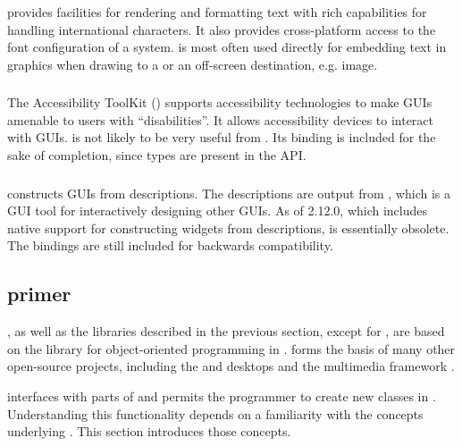 \documentclass[article,shortnames]{jss}
\begin{document}
 provides facilities for rendering and formatting text with
rich capabilities for handling international characters. It also
provides cross-platform access to the font configuration of a system.
 is most often used directly for embedding text in graphics
when drawing to a  or an off-screen destination,
e.g. image.

\subsubsection[ATK]{} 

The Accessibility ToolKit () supports accessibility
technologies to make GUIs amenable to users with ``disabilities''.  It
allows accessibility devices to interact with 
GUIs.  is not likely to be very useful from . Its
binding is included for the sake of completion, since  types
are present in the  API.

\subsubsection[Libglade]{}

 constructs  GUIs from 
descriptions.
The  descriptions are output from
, which is a GUI tool for interactively designing other
GUIs. 
As of  2.12.0, which includes native support for
constructing widgets from  descriptions, 
is
essentially obsolete. The bindings are still included for backwards
compatibility.

\subsection[GObject primer]{
primer}\label{sec:primer}

, as well as the libraries described in the previous
section, except for , are based on the 
library for object-oriented programming in . 
forms the basis of many other open-source projects, including the
 \citep{GNOME} and  
\citep{xfce} desktops and the  multimedia framework
\citep{gstreamer}.

 interfaces with parts of  and permits the
  programmer to create new  classes in
. Understanding this functionality depends on a
familiarity with the concepts underlying 
. This section introduces those concepts.
\end{document}
